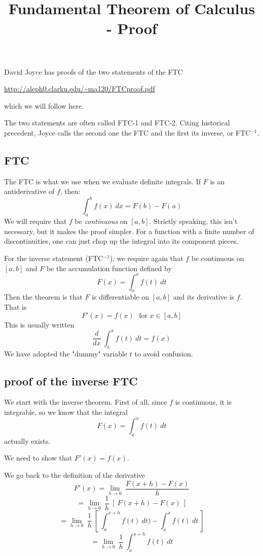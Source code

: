 \documentclass[11pt, oneside]{article}   	%
\title{Fundamental Theorem of Calculus - Proof}
\date{}							%
\begin{document}
\maketitle
\Large

David Joyce has proofs of the two statements of the FTC

\url{http://aleph0.clarku.edu/~ma120/FTCproof.pdf}

which we will follow here.

The two statements are often called FTC-1 and FTC-2.  Citing historical precedent, Joyce calls the second one the FTC and the first its inverse, or FTC$^{-1}$.
\subsection*{FTC}
The FTC is what we use when we evaluate definite integrals.  If $F$ is an antiderivative of $f$, then:
\[ \int_a^b f(x) \ dx = F(b) - F(a) \]
We will require that $f$ be \emph{continuous} on $[a,b]$.  Strictly speaking, this isn't necessary, but it makes the proof simpler.  For a function with a finite number of discontinuities, one can just chop up the integral into its component pieces.

For the inverse statement (FTC$^{-1}$), we require again that $f$ be continuous on $[a,b]$ and $F$ be the accumulation function defined by
\[ F(x) = \int_a^x f(t) \ dt \]
Then the theorem is that $F$ is differentiable on $[a,b]$ and its derivative is $f$.  That is
\[ F'(x) = f(x) \ \ \ \text{for } x \in [a,b] \]
This is usually written
\[ \frac{d}{dx} \ \int_a^x f(t) \ dt = f(x) \]
We have adopted the "dummy" variable $t$ to avoid confusion.
\subsection*{proof of the inverse FTC}
We start with the inverse theorem.  First of all, since $f$ is continuous, it is integrable, so we know that the integral
\[ F(x) = \int_a^x f(t) \ dt \]
actually exists.

We need to show that $F'(x) = f(x)$.  

We go back to the definition of the derivative
\[ F'(x) = \lim_{h \rightarrow 0} \ \frac{F(x+h) - F(x)}{h} \]
\[ = \lim_{h \rightarrow 0} \ \frac{1}{h} \ [ \ F(x+h) - F(x) \ ] \]
\[ = \lim_{h \rightarrow 0} \ \frac{1}{h} \ [ \ \int_a^{x+h} f(t) \ dt) - \int_a^x f(t) \ dt \ ] \]
\[ = \lim_{h \rightarrow 0} \ \frac{1}{h} \ \int_x^{x+h} f(t) \ dt \]
\end{document}

